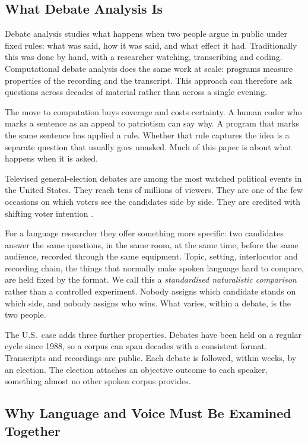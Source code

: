 \documentclass[pdflatex,sn-mathphys-num]{sn-jnl}%
\begin{document}
\subsection{What Debate Analysis Is}
\label{sec:intro:what}

Debate analysis studies what happens when two people argue in public under
fixed rules: what was said, how it was said, and what effect it had.
Traditionally this was done by hand, with a researcher watching,
transcribing and coding. Computational debate analysis does the same work
at scale: programs measure properties of the recording and the
transcript. This approach can therefore ask questions across decades of material
rather than across a single evening.

The move to computation buys coverage and costs certainty. A human coder
who marks a sentence as an appeal to patriotism can say why. A program that
marks the same sentence has applied a rule. Whether that rule captures
the idea is a separate question that usually goes unasked. Much of this
paper is about what happens when it is asked.

Televised general-election debates are among the most watched political
events in the United States. They reach tens of millions of viewers. They
are one of the few occasions on which voters see the candidates side by
side. They are credited with shifting voter intention
\cite{benoit2014debates}.

For a language researcher they offer something more specific: two
candidates answer the same questions, in the same room, at the same time,
before the same audience, recorded through the same equipment. Topic,
setting, interlocutor and recording chain, the things that normally make
spoken language hard to compare, are held fixed by the format. We call
this a \emph{standardised naturalistic comparison} rather than a controlled
experiment. Nobody assigns which candidate stands on which side, and
nobody assigns who wins. What varies, within a debate, is the two people.

The U.S.\ case adds three further properties. Debates have been held on a
regular cycle since 1988, so a corpus can span decades with a consistent
format. Transcripts and recordings are public. Each debate is followed,
within weeks, by an election. The election attaches an objective outcome to each
speaker, something almost no other spoken corpus provides.

\subsection{Why Language and Voice Must Be Examined Together}
\label{sec:intro:roles}
\end{document}
